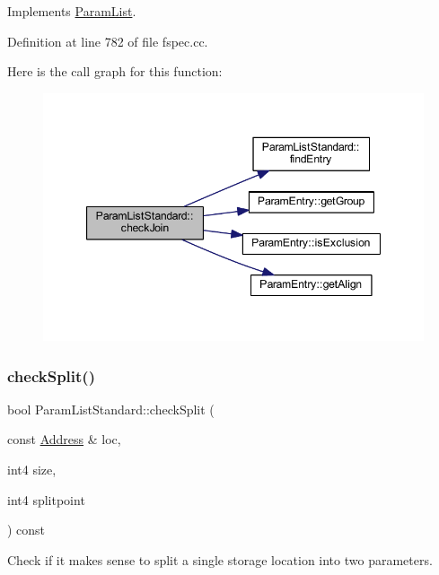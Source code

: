 Implements \mbox{\hyperlink{class_param_list_afbd77bcf71722f89a9ad9f4d9d20bdc5}{Param\+List}}.



Definition at line 782 of file fspec.\+cc.

Here is the call graph for this function\+:
\nopagebreak
\begin{figure}[H]
\begin{center}
\leavevmode
\includegraphics[width=347pt]{class_param_list_standard_ae051857a29a6ed3684c8110fcb53c85c_cgraph}
\end{center}
\end{figure}
\mbox{\label{class_param_list_standard_aec665632071c4504aec5b4c4d153cb62}} 
\subsubsection{\texorpdfstring{checkSplit()}{checkSplit()}}
{\footnotesize\ttfamily bool Param\+List\+Standard\+::check\+Split (\begin{DoxyParamCaption}\item[{const \mbox{\hyperlink{class_address}{Address}} \&}]{loc,  }\item[{int4}]{size,  }\item[{int4}]{splitpoint }\end{DoxyParamCaption}) const\hspace{0.3cm}{\ttfamily [virtual]}}



Check if it makes sense to split a single storage location into two parameters. 

